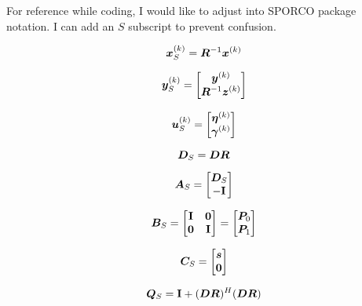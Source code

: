 \documentclass{article}
\begin{document}
For reference while coding, I would like to adjust into SPORCO package notation. I can add an $S$ subscript to prevent confusion.

\begin{equation}
\bm{x}_S^{(k)} = \bm{R}^{-1}\bm{x}^{(k)}
\end{equation}

\begin{equation}
\bm{y}_S^{(k)} = \begin{bmatrix} \bm{y}^{(k)} \\ \bm{R}^{-1}\bm{z}^{(k)} \end{bmatrix}
\end{equation}

\begin{equation}
\bm{u}_S^{(k)} = \begin{bmatrix} \bm{\eta}^{(k)} \\ \bm{\gamma}^{(k)} \end{bmatrix}
\end{equation}

\begin{equation}
\bm{D}_S = \bm{D}\bm{R}
\end{equation}

\begin{equation}
\bm{A}_S = \begin{bmatrix} \bm{D}_S \\ -{\bf I} \end{bmatrix}
\end{equation}

\begin{equation}
\bm{B}_S = \begin{bmatrix} {\bf I} & \bm{0} \\ \bm{0} & {\bf I} \end{bmatrix} = \begin{bmatrix} \bm{P}_0 \\ \bm{P}_1 \end{bmatrix}
\end{equation}

\begin{equation}
\bm{C}_S = \begin{bmatrix} \bm{s} \\ \bm{0} \end{bmatrix}
\end{equation}

\begin{equation}
\bm{Q}_S = {\bf I} + (\bm{D}\bm{R})^H(\bm{D}\bm{R})
\end{equation}
\end{document}
